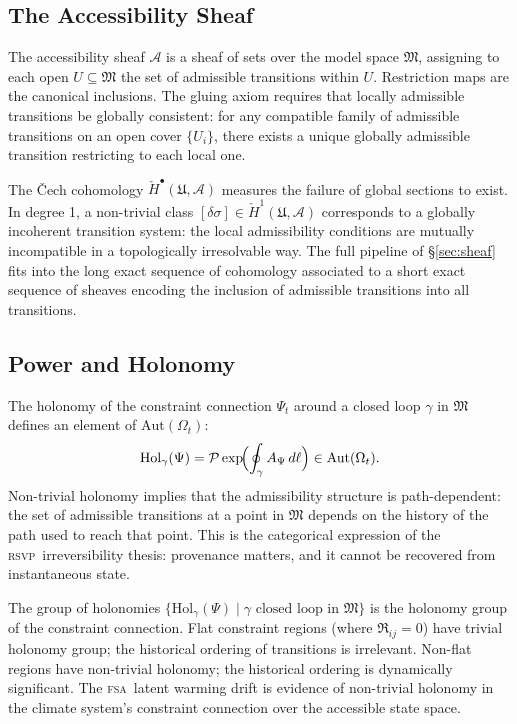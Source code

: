\documentclass[11pt,a4paper]{article}
\theoremstyle{plain}
\theoremstyle{definition}
\theoremstyle{remark}
\newcommand{\fM}{\mathfrak{M}}
\newcommand{\RSVP}{\textup{\textsc{rsvp}}}
\newcommand{\FSA}{\textup{\textsc{fsa}}}
\newcommand{\Omg}{\Omega}
\newcommand{\scrA}{\mathscr{A}}
\begin{document}
\subsection*{The Accessibility Sheaf}

The accessibility sheaf $\scrA$ is a sheaf of sets over the model space
$\fM$, assigning to each open $U \subseteq \fM$ the set of admissible
transitions within $U$. Restriction maps are the canonical inclusions.
The gluing axiom requires that locally admissible transitions be globally
consistent: for any compatible family of admissible transitions on an open
cover $\{U_i\}$, there exists a unique globally admissible transition
restricting to each local one.

The \v{C}ech cohomology $\check{H}^\bullet(\mathfrak{U}, \scrA)$ measures
the failure of global sections to exist. In degree 1, a non-trivial class
$[\delta\sigma] \in \check{H}^1(\mathfrak{U}, \scrA)$ corresponds to a
globally incoherent transition system: the local admissibility conditions
are mutually incompatible in a topologically irresolvable way. The
full pipeline of \S\ref{sec:sheaf} fits into the long exact sequence of
cohomology associated to a short exact sequence of sheaves encoding the
inclusion of admissible transitions into all transitions.

\subsection*{Power and Holonomy}

The holonomy of the constraint connection $\Psi_t$ around a closed loop
$\gamma$ in $\fM$ defines an element of $\mathrm{Aut}(\Omg_t)$:
\[
\mathrm{Hol}_\gamma(\Psi) = \mathcal{P}\exp\!\Bigl(
\oint_\gamma A_\Psi\,d\ell\Bigr) \in \mathrm{Aut}(\Omg_t).
\]
Non-trivial holonomy implies that the admissibility structure is
path-dependent: the set of admissible transitions at a point in $\fM$
depends on the history of the path used to reach that point. This is
the categorical expression of the \RSVP\ irreversibility thesis:
provenance matters, and it cannot be recovered from instantaneous state.

The group of holonomies $\{\mathrm{Hol}_\gamma(\Psi) \mid \gamma
\text{ closed loop in } \fM\}$ is the holonomy group of the constraint
connection. Flat constraint regions (where $\mathfrak{R}_{ij} = 0$) have
trivial holonomy group; the historical ordering of transitions is
irrelevant. Non-flat regions have non-trivial holonomy; the historical
ordering is dynamically significant. The \FSA\ latent warming drift is
evidence of non-trivial holonomy in the climate system's constraint
connection over the accessible state space.
\end{document}

